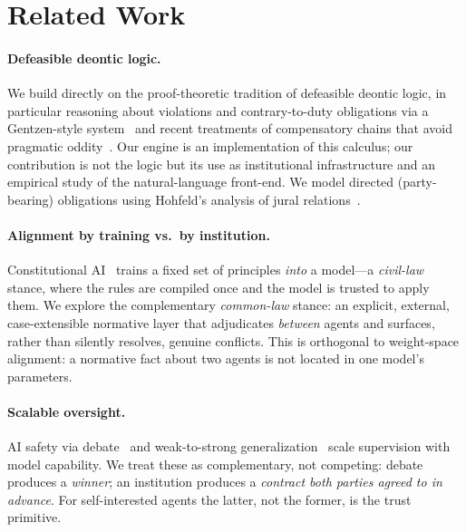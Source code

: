 \section{Related Work}\label{sec:related}
\paragraph{Defeasible deontic logic.} We build directly on the proof-theoretic tradition of
defeasible deontic logic, in particular reasoning about violations and contrary-to-duty
obligations via a Gentzen-style system~\citep{governatori2006violations} and recent treatments
of compensatory chains that avoid pragmatic oddity~\citep{governatori2024oddity}. Our engine
is an implementation of this calculus; our contribution is not the logic but its use as
institutional infrastructure and an empirical study of the natural-language front-end. We model
directed (party-bearing) obligations using Hohfeld's analysis of jural
relations~\citep{hohfeld1913}.

\paragraph{Alignment by training vs.\ by institution.} Constitutional AI~\citep{bai2022constitutional}
trains a fixed set of principles \emph{into} a model---a \emph{civil-law} stance, where the rules
are compiled once and the model is trusted to apply them. We explore the complementary
\emph{common-law} stance: an explicit, external, case-extensible normative layer that adjudicates
\emph{between} agents and surfaces, rather than silently resolves, genuine conflicts. This is
orthogonal to weight-space alignment: a normative fact about two agents is not located in one
model's parameters.

\paragraph{Scalable oversight.} AI safety via debate~\citep{irving2018debate} and
weak-to-strong generalization~\citep{burns2023weak} scale supervision with model capability.
We treat these as complementary, not competing: debate produces a \emph{winner}; an institution
produces a \emph{contract both parties agreed to in advance}. For self-interested agents the latter,
not the former, is the trust primitive.

